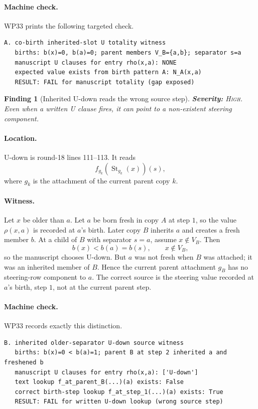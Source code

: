\documentclass[11pt]{article}
\newcommand{\St}{\operatorname{St}}
\newcommand{\sev}[1]{\textsc{#1}}
\newcommand{\rhoR}{\rho}
\newtheorem{finding}{Finding}
\theoremstyle{remark}
\begin{document}
\paragraph{Machine check.}
WP33 prints the following targeted check.
\begin{lstlisting}[style=reviewtext]
A. co-birth inherited-slot U totality witness
   births: b(x)=0, b(a)=0; parent members V_B={a,b}; separator s=a
   manuscript U clauses for entry rho(x,a): NONE
   expected value exists from birth pattern A: N_A(x,a)
   RESULT: FAIL for manuscript totality (gap exposed)
\end{lstlisting}

\begin{finding}[Inherited U-down reads the wrong source step]
\label{find:inherited-down}
\textbf{Severity:} \sev{High}.  Even when a written U clause fires, it can point to a non-existent steering component.
\end{finding}

\paragraph{Location.}
U-down is round-18 lines 111--113.  It reads
\[
  f_{g_k}(\St_{g_k}(x))(s),
\]
where $g_k$ is the attachment of the current parent copy $k$.

\paragraph{Witness.}
Let $x$ be older than $a$.  Let $a$ be born fresh in copy $A$ at step $1$, so the value $\rhoR(x,a)$ is recorded at $a$'s birth.  Later copy $B$ inherits $a$ and creates a fresh member $b$.  At a child of $B$ with separator $s=a$, assume $x\notin V_B$.  Then
\[
  b(x)<b(a)=b(s), \qquad x\notin V_B,
\]
so the manuscript chooses U-down.  But $a$ was not fresh when $B$ was attached; it was an inherited member of $B$.  Hence the current parent attachment $g_B$ has no steering-row component to $a$.  The correct source is the steering value recorded at $a$'s birth, step $1$, not at the current parent step.

\paragraph{Machine check.}
WP33 records exactly this distinction.
\begin{lstlisting}[style=reviewtext]
B. inherited older-separator U-down source witness
   births: b(x)=0 < b(a)=1; parent B at step 2 inherited a and freshened b
   manuscript U clauses for entry rho(x,a): ['U-down']
   text lookup f_at_parent_B(...)(a) exists: False
   correct birth-step lookup f_at_step_1(...)(a) exists: True
   RESULT: FAIL for written U-down lookup (wrong source step)
\end{lstlisting}
\end{document}

